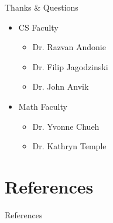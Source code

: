 \documentclass[presentation]{beamer}
\begin{document}
\begin{frame}[t]{Thanks \& Questions}
\begin{itemize}
\item{CS Faculty
\begin{itemize}
\item{Dr. Razvan Andonie}
\item{Dr. Filip Jagodzinski}
\item{Dr. John Anvik}
\end{itemize}
}
\item{Math Faculty
\begin{itemize}
\item{Dr. Yvonne Chueh}
\item{Dr. Kathryn Temple}
\end{itemize}
}
\end{itemize}
\end{frame}

\section{References}

\begin{frame}[allowframebreaks]{References}
\begin{center}


\end{center}
\end{frame}
\end{document}
